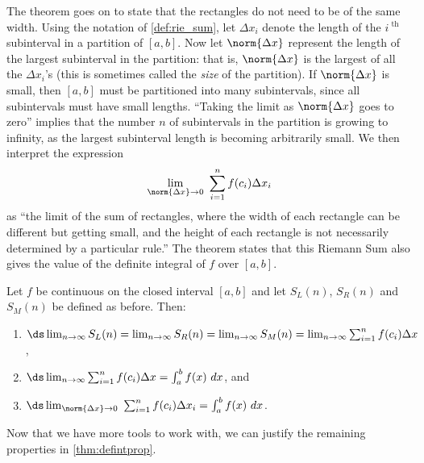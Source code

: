 The theorem goes on to state that the rectangles do not need to be of the same width. Using the notation of \autoref{def:rie_sum}, let $\Delta x_i$ denote the length of the $i^\text{ th}$ subinterval in a partition of $[a,b]$. Now let $\norm{\Delta x}$ represent the length of the largest subinterval in the partition: that is, $\norm{\Delta x}$ is the largest of all the $\Delta x_i$'s (this is sometimes called the \emph{size} of the partition). If $\norm{\Delta x}$ is small, then $[a,b]$ must be partitioned into many subintervals, since all subintervals must have small lengths. ``Taking the limit as $\norm{\Delta x}$ goes to zero'' implies that the number $n$ of subintervals in the partition is growing to infinity, as the largest subinterval length is becoming arbitrarily small. We then interpret the expression 
\[\lim_{\norm{\Delta x}\to 0}\ \sum_{i=1}^n f(c_i)\Delta x_i\]
as ``the limit of the sum of rectangles, where the width of each rectangle can be different but getting small, and the height of each rectangle is not necessarily determined by a particular rule.'' The theorem states that this Riemann Sum also gives the value of the definite integral of $f$ over $[a,b]$.

{Let $f$ be continuous on the closed interval $[a,b]$  and let $S_L(n)$, $S_R(n)$ and $S_M(n)$ be defined as before. Then:
\begin{enumerate}
	\item	$\ds \lim_{n\to\infty} S_L(n) = \lim_{n\to\infty} S_R(n) = \lim_{n\to\infty} S_M(n) = \lim_{n\to\infty}\sum_{i=1}^n f(c_i)\Delta x$, 
	\item	$\ds \lim_{n\to\infty}\sum_{i=1}^n f(c_i)\Delta x = \int_a^b f(x)\ dx$, and
	\item	$\ds \lim_{\norm{\Delta x}\to 0}\ \sum_{i=1}^n f(c_i)\Delta x_i = \int_a^b f(x)\ dx$.
\end{enumerate}}

Now that we have more tools to work with, we can justify the remaining properties in \autoref{thm:defintprop}. 

%


